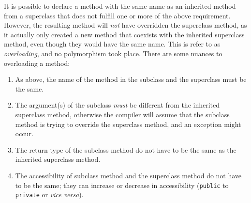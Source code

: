 \documentclass{tufte-handout}
\begin{document}
    It is possible to declare a method with the same name as an inherited method from a superclass that does not fulfill one or more of the above requirement. However, the resulting method will \emph{not} have overridden the superclass method, as it actually only created a new method that coexists with the inherited superclass method, even though they would have the same name. This is refer to as \emph{overloading}, and no polymorphism took place. There are some nuances to overloading a method:

    \begin{enumerate}
        \item As above, the name of the method in the subclass and the superclass must be the same.
        \item The argument(s) of the subclass \emph{must} be different from the inherited superclass method, otherwise the compiler will assume that the subclass method is trying to override the superclass method, and an exception might occur.
        \item The return type of the subclass method do not have to be the same as the inherited superclass method.
        \item The accessibility of subclass method and the superclass method do not have to be the same; they can increase or decrease in accessibility (\texttt{public} to \texttt{private} or \textit{vice versa}).
    \end{enumerate}
\end{document}
